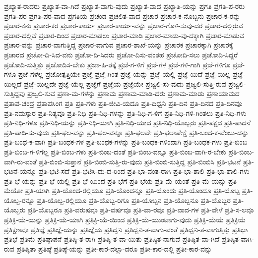{ಪ್ರಖ್ಯಾತ-ರಾದರು
ಪ್ರಖ್ಯಾತ-ವಾ-ಗಿದೆ
ಪ್ರಖ್ಯಾತ-ವಾಗು-ವುದು
ಪ್ರಖ್ಯಾತ-ವಾದ
ಪ್ರಖ್ಯಾತಿ-ಯನ್ನು
ಪ್ರಗತಿ
ಪ್ರಗತಿ-ಪ-ರರು
ಪ್ರಗತಿ-ಪರ
ಪ್ರಗತಿ-ಪರ-ವಾದ
ಪ್ರಗತಿಯ
ಪ್ರಚಂಡ
ಪ್ರಚಲಿತ-ವಾದ
ಪ್ರಚಾರ
ಪ್ರಚಾರ-ಕ-ನೊಬ್ಬನು
ಪ್ರಚಾರ-ಕ-ರನ್ನು
ಪ್ರಚಾರ-ಕನು
ಪ್ರಚಾರ-ಕರ
ಪ್ರಚಾರ-ಕಾರ್ಯ
ಪ್ರಚಾರ-ಕಾರ್ಯ-ವನ್ನು
ಪ್ರಚಾರ-ಗೊಳಿ-ಸುವು-ದರ
ಪ್ರಚಾರ-ದಲ್ಲಿರುವ
ಪ್ರಚಾರ-ದಲ್ಲಿವೆ
ಪ್ರಚಾರ-ದಿಂದ
ಪ್ರಚಾರ-ಮಾಡಲು
ಪ್ರಚಾರ-ಮಾಡಿ
ಪ್ರಚಾರ-ಮಾಡು-ವು-ದಕ್ಕಾಗಿ
ಪ್ರಚಾರ-ಮಾಡುವ
ಪ್ರಚಾರ-ವನ್ನು
ಪ್ರಚಾರ-ವಾಗುತ್ತಿದ್ದ
ಪ್ರಚಾರ-ವಾಗುವ
ಪ್ರಚಾರ-ಶಾಖೆ-ಯನ್ನು
ಪ್ರಚಾರಕ
ಪ್ರಚಾರಕ್ಕಾಗಿ
ಪ್ರಚಾರಕ್ಕೆ
ಪ್ರಚಾರದ
ಪ್ರಚೋ-ದಿ-ಸಿದ-ವನು
ಪ್ರಚೋ-ದಿ-ಸಿದರು
ಪ್ರಚೋ-ದಿಸು-ವಂತಹ
ಪ್ರಚೋದಿ-ಸಲು
ಪ್ರಚೋದಿ-ಸಿದ್ದರೆ
ಪ್ರಚೋದಿ-ಸುತ್ತಿತ್ತು
ಪ್ರಚೋದಿಸ-ಬೇಕು
ಪ್ರಜಾ-ಹಿ-ತಕ್ಕೆ
ಪ್ರಜೆ-ಗ-ಳಿಗೆ
ಪ್ರಜೆ-ಗಳ
ಪ್ರಜೆ-ಗಳಿ-ಗಾಗಿ
ಪ್ರಜೆ-ಗಳಿಗೂ
ಪ್ರಜೆ-ಗಳೂ
ಪ್ರಜೆ-ಗಳೆಲ್ಲ
ಪ್ರಜೋತ್ಪತ್ತಿಯೇ
ಪ್ರಜ್ಞೆ
ಪ್ರಜ್ಞೆ-ಗಿಂತ
ಪ್ರಜ್ಞೆ-ಯನ್ನು
ಪ್ರಜ್ಞೆ-ಯಲ್ಲಿ
ಪ್ರಜ್ಞೆ-ಯಿದೆ
ಪ್ರಜ್ಞೆ-ಯಿಲ್ಲ
ಪ್ರಜ್ಞೆ-ಯಿಲ್ಲದೆ
ಪ್ರಜ್ಞೆ-ಯಿಲ್ಲದೇ
ಪ್ರಜ್ಞೆ-ಯೆಲ್ಲ
ಪ್ರಜ್ಞೆಗೆ
ಪ್ರಜ್ಞೆಯ
ಪ್ರಜ್ಞೆಯೇ
ಪ್ರಜ್ವಲಿ-ಸು-ವುದು
ಪ್ರಜ್ವಲಿ-ಸುತ್ತಿ-ರುವ
ಪ್ರಜ್ವಲಿ-ಸುತ್ತಿದ್ದವು
ಪ್ರಜ್ವಲಿ-ಸುವ
ಪ್ರಣಾ-ಮ-ಗಳನ್ನು
ಪ್ರಣಾಮ
ಪ್ರಣಾಮ-ಮಾಡಿ-ದರು
ಪ್ರಣಾಮ-ಮಾಡು
ಪ್ರಣಾಯಾಮದ
ಪ್ರತಾಪ-ಚಂದ್ರ
ಪ್ರತಾಪಸಿಂಗ
ಪ್ರತಿ
ಪ್ರತಿ-ಗಳು
ಪ್ರತಿ-ಜೀವಿ-ಯದೂ
ಪ್ರತಿ-ದಿಧ್ವನಿ
ಪ್ರತಿ-ದಿನ
ಪ್ರತಿ-ದಿನದ
ಪ್ರತಿ-ದಿನವೂ
ಪ್ರತಿ-ನಮಸ್ಕಾರ
ಪ್ರತಿ-ನಿತ್ಯವೂ
ಪ್ರತಿ-ನಿಧಿ
ಪ್ರತಿ-ನಿಧಿ-ಗಳನ್ನು
ಪ್ರತಿ-ನಿಧಿ-ಗ-ಳಿಗೆ
ಪ್ರತಿ-ನಿಧಿ-ಗಳಿ-ಗಿಂತಲು
ಪ್ರತಿ-ನಿಧಿ-ಗಳು
ಪ್ರತಿ-ನಿಧಿ-ಗಳೂ
ಪ್ರತಿ-ನಿಧಿ-ಯನ್ನು
ಪ್ರತಿ-ನಿಧಿ-ಯಾಗಿ
ಪ್ರತಿ-ನಿಧಿ-ಯಾದ
ಪ್ರತಿ-ನಿಧಿ-ಯೊಬ್ಬರು
ಪ್ರತಿ-ಪಕ್ಷದ
ಪ್ರತಿ-ಪಾದನೆ
ಪ್ರತಿ-ಪಾದಿ-ಸು-ವುದು
ಪ್ರತಿ-ಫಲ-ವನ್ನು
ಪ್ರತಿ-ಫಲ-ವನ್ನೂ
ಪ್ರತಿ-ಫಲವೇ
ಪ್ರತಿ-ಫಲಾಪೇಕ್ಷೆ
ಪ್ರತಿ-ಬಂದ-ಕ-ವೆಂಬು-ದನ್ನು
ಪ್ರತಿ-ಬಂಧ-ಕ-ವಾಗಿ
ಪ್ರತಿ-ಬಂಧಕ-ಗಳ
ಪ್ರತಿ-ಬಂಧಕ-ಗಳನ್ನು
ಪ್ರತಿ-ಬಂಧಕ-ಗಳಿಂದಾಗಿ
ಪ್ರತಿ-ಬಂಧಕ-ಗಳು
ಪ್ರತಿ-ಬಿಂಬ
ಪ್ರತಿ-ಬಿಂಬ-ಗ-ಳಿಗೆಲ್ಲ
ಪ್ರತಿ-ಬಿಂಬ-ಗಳು
ಪ್ರತಿ-ಬಿಂಬ-ದಂತೆ
ಪ್ರತಿ-ಬಿಂಬ-ವನ್ನೂ
ಪ್ರತಿ-ಬಿಂಬ-ವಾಗಿ-ರ-ಬೇಕು
ಪ್ರತಿ-ಬಿಂಬ-ವಾಗಿ-ರು-ವಂತೆ
ಪ್ರತಿ-ಬಿಂಬಿ-ಸುತ್ತಾನೆ
ಪ್ರತಿ-ಬಿಂಬಿ-ಸುತ್ತಿ-ರು-ವುದು
ಪ್ರತಿ-ಬಿಂಬಿ-ಸುತ್ತಿದ್ದ
ಪ್ರತಿ-ಬಿಂಬಿಸಿ
ಪ್ರತಿ-ಭಟನೆ
ಪ್ರತಿ-ಭಟನೆ-ಯನ್ನೂ
ಪ್ರತಿ-ಭಟಿ-ಸದೆ
ಪ್ರತಿ-ಭಟಿಸಿ-ದು-ದ-ರಿಂದ
ಪ್ರತಿ-ಭಾ-ವಂತ-ರಾಗಿ
ಪ್ರತಿ-ಭಾ-ಶಾಲಿ
ಪ್ರತಿ-ಭಾ-ಶಾಲಿ-ಗಳು
ಪ್ರತಿ-ಭೆ-ಯನ್ನು
ಪ್ರತಿ-ಭೆ-ಯಲ್ಲಿ
ಪ್ರತಿ-ಭೆ-ಯಿಂದ
ಪ್ರತಿ-ಭೆಗೆ
ಪ್ರತಿ-ಭೆಯ
ಪ್ರತಿ-ಮೆ-ಯಂತೆ
ಪ್ರತಿ-ಮೆ-ಯನ್ನು
ಪ್ರತಿ-ಮೆಯೋ
ಪ್ರತಿ-ಯಾಗಿ
ಪ್ರತಿ-ಯೊಂದ-ರಲ್ಲಿಯೂ
ಪ್ರತಿ-ಯೊಂದನ್ನೂ
ಪ್ರತಿ-ಯೊಂದು
ಪ್ರತಿ-ಯೊಂದೂ
ಪ್ರತಿ-ಯೊಬ್ಬ
ಪ್ರತಿ-ಯೊಬ್ಬ-ರನ್ನೂ
ಪ್ರತಿ-ಯೊಬ್ಬ-ರಲ್ಲಿಯೂ
ಪ್ರತಿ-ಯೊಬ್ಬ-ರಿಗೂ
ಪ್ರತಿ-ಯೊಬ್ಬನ
ಪ್ರತಿ-ಯೊಬ್ಬನೂ
ಪ್ರತಿ-ಯೊಬ್ಬರ
ಪ್ರತಿ-ಯೊಬ್ಬರು
ಪ್ರತಿ-ಯೊಬ್ಬರೂ
ಪ್ರತಿ-ವರುಷವೂ
ಪ್ರತಿ-ವರ್ಷವೂ
ಪ್ರತಿ-ವಾ-ರವೂ
ಪ್ರತಿ-ವಾದ-ಗಳ
ಪ್ರತಿ-ವೇಳೆ
ಪ್ರತಿ-ಸ-ಲವೂ
ಪ್ರತಿಕ್ರಿ-ಯೆ-ಯನ್ನು
ಪ್ರತಿಕ್ರಿ-ಯೆ-ಯಾಗಿ
ಪ್ರತಿಕ್ರಿ-ಯೆ-ಯಿಂದ
ಪ್ರತಿಕ್ರಿ-ಯೆ-ಯುಂಟಾಗು-ವುದು
ಪ್ರತಿಕ್ರಿ-ಯೆಯೆ
ಪ್ರತಿಕ್ರಿಯೆ
ಪ್ರತಿಕ್ಷಣವೂ
ಪ್ರತಿಜ್ಞೆ
ಪ್ರತಿಜ್ಞೆ-ಯನ್ನು
ಪ್ರತಿಜ್ಞೆಯ
ಪ್ರತಿದ್ವನಿ
ಪ್ರತಿಧ್ವನಿ-ತ-ವಾಗು-ವಂತೆ
ಪ್ರತಿಧ್ವನಿ-ತ-ವಾಗುತ್ತಿತ್ತು
ಪ್ರತಿಭಾ
ಪ್ರತಿಭೆ
ಪ್ರತಿಮೆ
ಪ್ರತಿಷ್ಠಾಪನೆ
ಪ್ರತಿಷ್ಠಿ-ತ-ರಾಗಿ
ಪ್ರತಿಷ್ಠಿ-ತ-ವಾ-ಯಿತು
ಪ್ರತಿಷ್ಠಿತ-ನಾಗುವೆ
ಪ್ರತಿಷ್ಠಿತ-ವಾ-ಗಿದೆ
ಪ್ರತಿಷ್ಠಿತ-ವಾಗಿ-ರುವ
ಪ್ರತಿಷ್ಠಿತಾ
ಪ್ರತಿಷ್ಠೆ
ಪ್ರತಿಷ್ಠೆ-ಯನ್ನು
ಪ್ರತೀ-ಕಾರ-ದಲ್ಲಾ-ದರೂ
ಪ್ರತೀ-ಕಾರ-ದಲ್ಲಿ
ಪ್ರತೀ-ಕಾರ-ವನ್ನು
}
